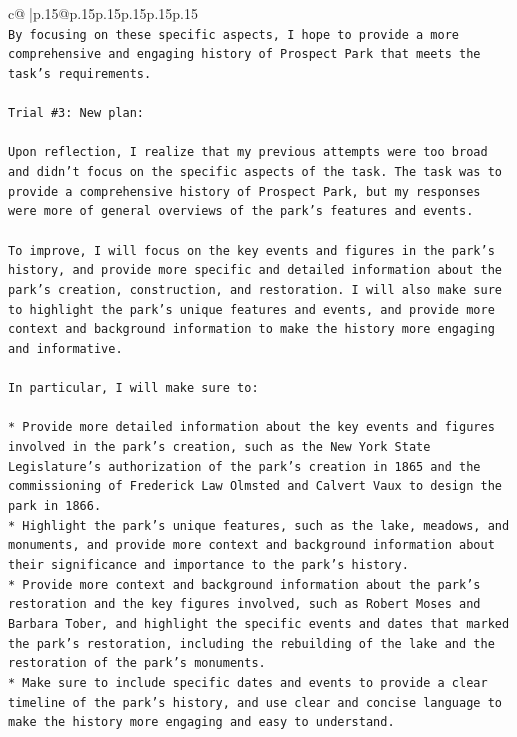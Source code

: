 \documentclass{article}
\begin{document}
{\begin{supertabular}{c@{$\;$}|p{.15\linewidth}@{}p{.15\linewidth}p{.15\linewidth}p{.15\linewidth}p{.15\linewidth}p{.15\linewidth}}
{{{\\ 
\texttt{By focusing on these specific aspects, I hope to provide a more comprehensive and engaging history of Prospect Park that meets the task's requirements.} \\
\\ 
\texttt{Trial \#3: New plan: } \\
\\ 
\texttt{Upon reflection, I realize that my previous attempts were too broad and didn't focus on the specific aspects of the task. The task was to provide a comprehensive history of Prospect Park, but my responses were more of general overviews of the park's features and events. } \\
\\ 
\texttt{To improve, I will focus on the key events and figures in the park's history, and provide more specific and detailed information about the park's creation, construction, and restoration. I will also make sure to highlight the park's unique features and events, and provide more context and background information to make the history more engaging and informative.} \\
\\ 
\texttt{In particular, I will make sure to:} \\
\\ 
\texttt{* Provide more detailed information about the key events and figures involved in the park's creation, such as the New York State Legislature's authorization of the park's creation in 1865 and the commissioning of Frederick Law Olmsted and Calvert Vaux to design the park in 1866.} \\
\texttt{* Highlight the park's unique features, such as the lake, meadows, and monuments, and provide more context and background information about their significance and importance to the park's history.} \\
\texttt{* Provide more context and background information about the park's restoration and the key figures involved, such as Robert Moses and Barbara Tober, and highlight the specific events and dates that marked the park's restoration, including the rebuilding of the lake and the restoration of the park's monuments.} \\
\texttt{* Make sure to include specific dates and events to provide a clear timeline of the park's history, and use clear and concise language to make the history more engaging and easy to understand.} \\
\\ 
}}}
\end{supertabular}}
\end{document}
